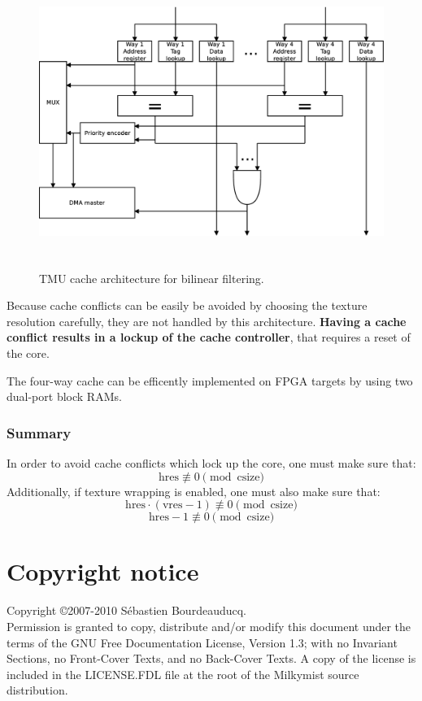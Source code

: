 \documentclass[a4paper,11pt]{article}
\begin{document}
\begin{figure}[H]
\centering
\includegraphics[height=95mm]{carch.eps}
\caption{TMU cache architecture for bilinear filtering.}\label{fig:carch}
\end{figure}

Because cache conflicts can be easily be avoided by choosing the texture resolution carefully, they are not handled by this architecture. \textbf{Having a cache conflict results in a lockup of the cache controller}, that requires a reset of the core.

The four-way cache can be efficently implemented on FPGA targets by using two dual-port block RAMs.

\subsubsection{Summary}
In order to avoid cache conflicts which lock up the core, one must make sure that:
\begin{equation*}
\text{hres} \not \equiv 0 \pmod{\text{csize}}
\end{equation*}
Additionally, if texture wrapping is enabled, one must also make sure that:
\begin{equation*}
\text{hres}\cdot(\text{vres}-1) \not \equiv 0 \pmod{\text{csize}}
\end{equation*}
\begin{equation*}
\text{hres}-1 \not \equiv 0 \pmod{\text{csize}}
\end{equation*}

\section*{Copyright notice}
Copyright \copyright 2007-2010 S\'ebastien Bourdeauducq. \\
Permission is granted to copy, distribute and/or modify this document under the terms of the GNU Free Documentation License, Version 1.3; with no Invariant Sections, no Front-Cover Texts, and no Back-Cover Texts. A copy of the license is included in the LICENSE.FDL file at the root of the Milkymist source distribution.
\end{document}
